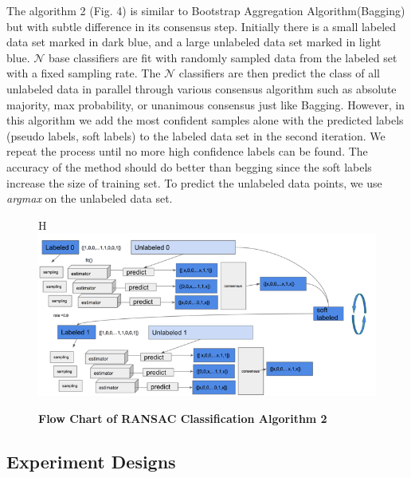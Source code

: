 \documentclass[a4paper, times, 12pt, ,onecolumn,oneside,top=1.0cm,bottom=1.0cm,left=1.0 cm,right=1cm]{article}
\begin{document}
 The algorithm 2 (Fig. 4) is similar to Bootstrap Aggregation Algorithm(Bagging) but with subtle difference in its consensus step. Initially there is a small labeled data set marked in dark blue, and a large unlabeled data set marked in light blue. $\mathcal{N}$ base classifiers are fit with randomly sampled data from the labeled set with a fixed sampling rate. The $\mathcal{N}$ classifiers are then  predict the class of all unlabeled data in parallel through various consensus algorithm such as absolute majority, max probability, or unanimous consensus just like Bagging. However, in this algorithm we add the most confident samples alone with the predicted labels (pseudo labels, soft labels) to the labeled data set in the second iteration. We repeat the process until no more high confidence labels can be found. The accuracy of the method should do better than begging since the soft labels increase the size of training set. To predict the unlabeled data points, we use \textit{argmax} on the unlabeled data set.
 \begin{figure}{H}
   \centering
  \includegraphics[scale = 0.5]{imgs/algo2.png}
  \caption{ \textbf{Flow Chart of RANSAC Classification Algorithm 2}}
    \end{figure}

\subsection{Experiment Designs}
\end{document}
